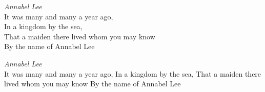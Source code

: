 \documentclass{article}
\begin{document}
\emph{Annabel Lee}\\[3mm]
It was many and many a year ago,\\
In a kingdom by the sea,\\
That a maiden there lived whom you may know\\
By the name of Annabel Lee

\emph{Annabel Lee}\\[3mm]
It was many and many a year ago,\linebreak
In a kingdom by the sea,\linebreak
That a maiden there lived whom you may know\linebreak
By the name of Annabel Lee
\end{document}
